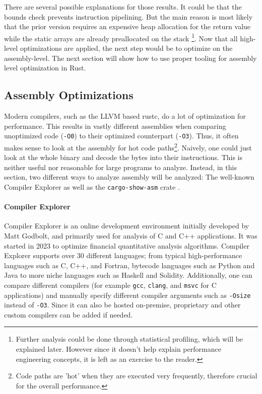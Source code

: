 There are several possible explanations for those results. It could be that the bounds check prevents instruction pipelining. But the main reason is most likely that the prior version requires an expensive heap allocation for the return value while the static arrays are already preallocated on the stack \footnote{Further analysis could be done through statistical profiling, which will be explained later. However since it doesn't help explain performance engineering concepts, it is left as an exercise to the reader.}. Now that all high-level optimizations are applied, the next step would be to optimize on the assembly-level. The next section will show how to use proper tooling for assembly level optimization in Rust.

\subsection{Assembly Optimizations}
Modern compilers, such as the \ac{LLVM} based rustc, do a lot of optimization for performance. This results in vastly different assemblies when comparing unoptimized code (\texttt{-O0}) to their optimized counterpart (\texttt{-O3}). Thus, it often makes sense to look at the assembly for hot code paths\footnote{Code paths are 'hot' when they are executed very frequently, therefore crucial for the overall performance.}. Naively, one could just look at the whole binary and decode the bytes into their instructions. This is neither useful nor reasonable for large programs to analyze. Instead, in this section, two different ways to analyze assembly will be analyzed: The well-known Compiler Explorer \cite{compilerexplorer} as well as the \texttt{cargo-show-asm} crate \cite{cargoshowasm}.

\paragraph{Compiler Explorer}

Compiler Explorer \cite{compilerexplorer} is an online development environment initially developed by Matt Godbolt, and primarily used for analysis of C and C++ applications. It was started in 2023 to optimize financial quantitative analysis algorithms. Compiler Explorer supports over 30 different languages; from typical high-performance languages such as C, C++, and Fortran, bytecode languages such as Python and Java to more niche languages such as Haskell and Solidity. Additionally, one can compare different compilers (for example \texttt{gcc}, \texttt{clang}, and \texttt{msvc} for C applications) and manually specify different compiler arguments such as \texttt{-Osize} instead of \texttt{-O3}. Since it can also be hosted on-premise, proprietary and other custom compilers can be added if needed.

